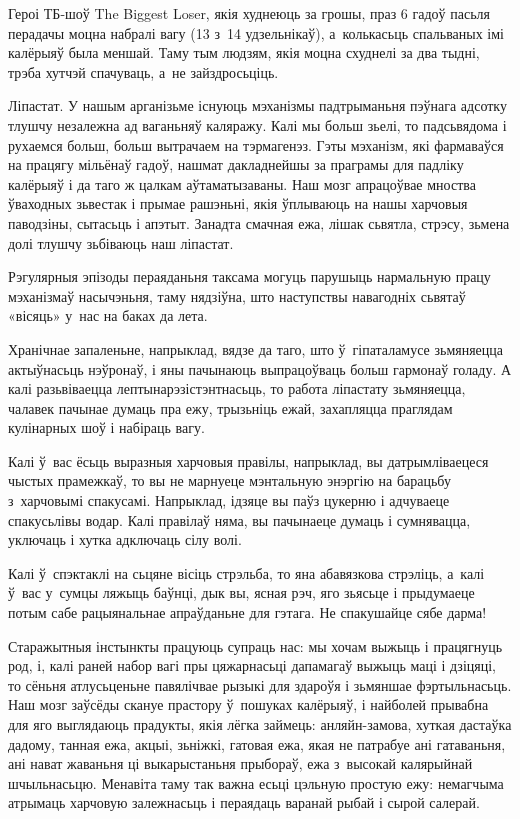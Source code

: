 Героі ТБ-шоў The Biggest Loser, якія худнеюць за грошы, праз 6 гадоў пасьля перадачы моцна набралі вагу (13 з~14 удзельнікаў), а~колькасьць спальваных імі калёрыяў была меншай. Таму тым людзям, якія моцна схуднелі за два тыдні, трэба хутчэй спачуваць, а~не зайздросьціць.

Ліпастат. У нашым арганізьме існуюць мэханізмы падтрыманьня пэўнага адсотку тлушчу незалежна ад ваганьняў каляражу. Калі мы больш зьелі, то падсьвядома і рухаемся больш, больш вытрачаем на тэрмагенэз. Гэты мэханізм, які фармаваўся на працягу мільёнаў гадоў, нашмат дакладнейшы за праграмы для падліку калёрыяў і да таго ж цалкам аўтаматызаваны. Наш мозг апрацоўвае мноства ўваходных зьвестак і прымае рашэньні, якія ўплываюць на нашы харчовыя паводзіны, сытасьць і апэтыт. Занадта смачная ежа, лішак сьвятла, стрэсу, зьмена долі тлушчу зьбіваюць наш ліпастат.

Рэгулярныя эпізоды пераяданьня таксама могуць парушыць нармальную працу мэханізмаў насычэньня, таму нядзіўна, што наступствы навагодніх сьвятаў «вісяць» у~нас на баках да лета.

Хранічнае запаленьне, напрыклад, вядзе да таго, што ў~гіпаталамусе зьмяняецца актыўнасьць нэўронаў, і яны пачынаюць выпрацоўваць больш гармонаў голаду. А калі разьвіваецца лептынарэзістэнтнасьць, то работа ліпастату зьмяняецца, чалавек пачынае думаць пра ежу, трызьніць ежай, захапляцца праглядам кулінарных шоў і набіраць вагу.

Калі ў~вас ёсьць выразныя харчовыя правілы, напрыклад, вы датрымліваецеся чыстых прамежкаў, то вы не марнуеце мэнтальную энэргію на барацьбу з~харчовымі спакусамі. Напрыклад, ідзяце вы паўз цукерню і адчуваеце спакусьлівы водар. Калі правілаў няма, вы пачынаеце думаць і сумнявацца, уключаць і хутка адключаць сілу волі.

Калі ў~спэктаклі на сьцяне вісіць стрэльба, то яна абавязкова стрэліць, а~калі ў~вас у~сумцы ляжыць баўнці, дык вы, ясная рэч, яго зьясьце і прыдумаеце потым сабе рацыянальнае апраўданьне для гэтага. Не спакушайце сябе дарма!

Старажытныя інстынкты працуюць супраць нас: мы хочам выжыць і працягнуць род, і, калі раней набор вагі пры цяжарнасьці дапамагаў выжыць маці і дзіцяці, то сёньня атлусьценьне павялічвае рызыкі для здароўя і зьмяншае фэртыльнасьць. Наш мозг заўсёды скануе прастору ў~пошуках калёрыяў, і найболей прывабна для яго выглядаюць прадукты, якія лёгка займець: анляйн-замова, хуткая дастаўка дадому, танная ежа, акцыі, зьніжкі, гатовая ежа, якая не патрабуе ані гатаваньня, ані нават жаваньня ці выкарыстаньня прыбораў, ежа з~высокай калярыйнай шчыльнасьцю. Менавіта таму так важна есьці цэльную простую ежу: немагчыма атрымаць харчовую залежнасьць і пераядаць варанай рыбай і сырой салерай.

